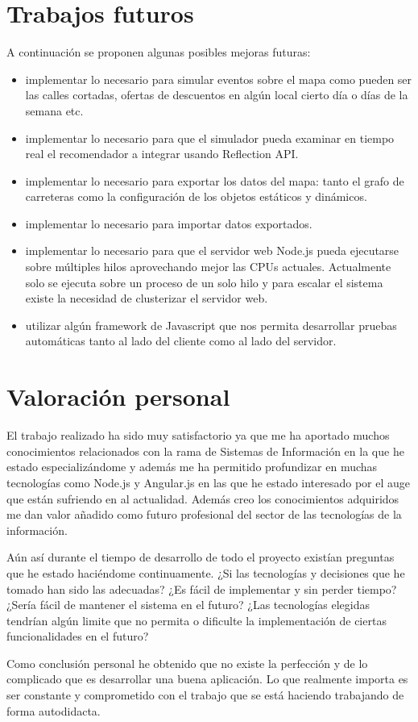 \section{Trabajos futuros}

A continuación se proponen algunas posibles mejoras futuras:

\begin{itemize}
	\item implementar lo necesario para simular eventos sobre el mapa como pueden ser las calles cortadas, ofertas de descuentos en algún local cierto día o días de la semana etc.
	\item implementar lo necesario para que el simulador pueda examinar en tiempo real el recomendador a integrar usando Reflection API.
	\item implementar lo necesario para exportar los datos del mapa: tanto el grafo de carreteras como la configuración de los objetos estáticos y dinámicos.
	\item implementar lo necesario para importar datos exportados.
	\item implementar lo necesario para que el servidor web Node.js pueda ejecutarse sobre múltiples hilos aprovechando mejor las CPUs actuales. Actualmente solo se ejecuta sobre un proceso de un solo hilo y para escalar el sistema existe la necesidad de clusterizar el servidor web.
	\item utilizar algún framework de Javascript que nos permita desarrollar pruebas automáticas tanto al lado del cliente como al lado del servidor.
\end{itemize}

\section{Valoración personal}

El trabajo realizado ha sido muy satisfactorio ya que me ha aportado muchos conocimientos relacionados con la rama de Sistemas de Información en la que he estado especializándome y además me ha permitido profundizar en muchas tecnologías como Node.js y Angular.js en las que he estado interesado por el auge que están sufriendo en al actualidad. Además creo los conocimientos adquiridos me dan valor añadido como futuro profesional del sector de las tecnologías de la información.

Aún así durante el tiempo de desarrollo de todo el proyecto existían preguntas que he estado haciéndome continuamente. ¿Si las tecnologías y decisiones que he tomado han sido las adecuadas? ¿Es fácil de implementar y sin perder tiempo? ¿Sería fácil de mantener el sistema en el futuro? ¿Las tecnologías elegidas tendrían algún limite que no permita o dificulte la implementación de ciertas funcionalidades en el futuro? 

Como conclusión personal he obtenido que no existe la perfección y de lo complicado que es desarrollar una buena aplicación. Lo que realmente importa es ser constante y comprometido con el trabajo que se está haciendo trabajando de forma autodidacta.